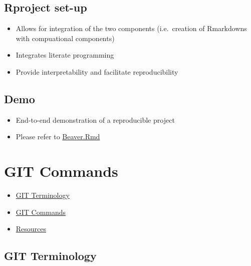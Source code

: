 \documentclass[
  12pt,
]{book}
\providecommand{\tightlist}{%
  \setlength{\itemsep}{0pt}\setlength{\parskip}{0pt}}
\begin{document}
\hypertarget{rproject-set-up}{%
\section{Rproject set-up}\label{rproject-set-up}}

\begin{itemize}
\tightlist
\item
  Allows for integration of the two components (i.e.~creation of Rmarkdowns with compuational components)
\item
  Integrates literate programming
\item
  Provide interpretability and facilitate reproducibility
\end{itemize}

\hypertarget{demo}{%
\section{Demo}\label{demo}}

\begin{itemize}
\tightlist
\item
  End-to-end demonstration of a reproducible project
\item
  Please refer to \href{Beavers.Rmd}{Beaver.Rmd}
\end{itemize}

\hypertarget{git-commands}{%
\chapter{GIT Commands}\label{git-commands}}

\begin{itemize}
\tightlist
\item
  \protect\hyperlink{git-terminology}{GIT Terminology}
\item
  \protect\hyperlink{git-commands}{GIT Commands}
\item
  \protect\hyperlink{resources}{Resources}
\end{itemize}

\hypertarget{git-terminology}{%
\section{GIT Terminology}\label{git-terminology}}
\end{document}
